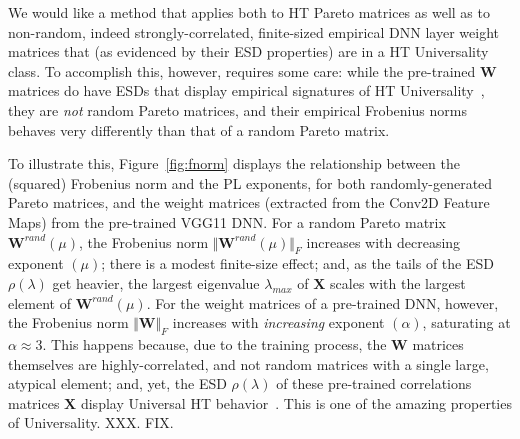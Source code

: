 We would like a method that applies both to HT Pareto matrices as well as to non-random, indeed strongly-correlated, finite-sized empirical DNN layer weight matrices that (as evidenced by their ESD properties) are in a HT Universality class.  
To accomplish this, however, requires some care: while the pre-trained $\mathbf{W}$ matrices do have ESDs that display empirical signatures of HT Universality~\cite{MM18_TR}, they are \emph{not} random Pareto matrices, and their empirical Frobenius norms behaves very differently than that of a random Pareto matrix.  

To illustrate this, Figure~\ref{fig:fnorm} displays the relationship between the (squared) Frobenius norm and the PL exponents, for both randomly-generated Pareto matrices, and the weight matrices
(extracted from the Conv2D Feature Maps) from the pre-trained VGG11 DNN.
%
For a random Pareto matrix $\mathbf{W}^{rand}(\mu)$, the Frobenius norm $\Vert\mathbf{W}^{rand}(\mu)\Vert_{F}$ increases with decreasing exponent $(\mu)$; there is a modest finite-size effect; and, as the tails of the ESD $\rho(\lambda)$ get heavier, the largest eigenvalue $\lambda_{max}$ of $\mathbf{X}$ scales with the largest element of $\mathbf{W}^{rand}(\mu)$. 
For the weight matrices of a pre-trained DNN, however, the Frobenius norm $\Vert\mathbf{W}\Vert_{F}$ increases with \emph{increasing} exponent $(\alpha)$, saturating at $\alpha\approx 3$.
This happens because, due to the training process, the $\mathbf{W}$ matrices themselves are highly-correlated, and not random matrices with a single large, atypical element;   
and, yet, the ESD $\rho(\lambda)$ of these pre-trained correlations matrices $\mathbf{X}$ display Universal HT behavior~\cite{MM18_TR}.
This is one of the amazing properties of Universality.
XXX.  FIX.

 
 
